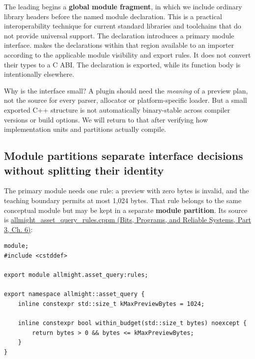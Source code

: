 The leading  begins a \textbf{global module fragment}, in which we include ordinary library headers before the named module declaration. This is a practical interoperability technique for current standard libraries and toolchains that do not provide universal  support. The  declaration introduces a primary module interface.  makes the declarations within that region available to an importer according to the applicable module visibility and export rules. It does not convert their types to a C ABI. The  declaration is exported, while its function body is intentionally elsewhere.

Why is the interface small? A plugin should need the \emph{meaning} of a preview plan, not the source for every parser, allocator or platform-specific loader. But a small exported C++ structure is not automatically binary-stable across compiler versions or build options. We will return to that after verifying how implementation units and partitions actually compile.

\subsection{Module partitions separate interface decisions without splitting their identity}\label{05-engine-i-ch006-module-partitions-separate-interface-decisions-without-splitting-their-identity}

\hypertarget{05-engine-i-ch006-module-partitions-separate-interface-decisions-without-splitting-their-identity}{}

The primary module needs one rule: a preview with zero bytes is invalid, and the teaching boundary permits at most 1,024 bytes. That rule belongs to the same conceptual module but may be kept in a separate \textbf{module partition}. Its source is \href{../01-Bits-Programs-and-Reliable-Systems-P03/main.pdf\#source-file-b84757ff09b490e82f7f98ea}{allmight\_asset\_query\_rules.cppm (Bits, Programs, and Reliable Systems, Part 3, Ch. 6)}:

\begin{verbatim}
module;
#include <cstddef>

export module allmight.asset_query:rules;

export namespace allmight::asset_query {
    inline constexpr std::size_t kMaxPreviewBytes = 1024;

    inline constexpr bool within_budget(std::size_t bytes) noexcept {
        return bytes > 0 && bytes <= kMaxPreviewBytes;
    }
}
\end{verbatim}

